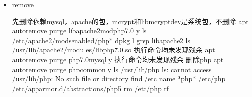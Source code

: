 \documentclass[a4paper,10pt,english]{sphinxmanual}
\begin{document}
\begin{itemize}
\begin{sphinxVerbatim}[commandchars=\\\{\}]
   
   

   
 
   
       
                                                                         \PYG{p}{[}\PYG{p}{]}
                                                           
\end{sphinxVerbatim}

\item {} 
remove

\begin{sphinxVerbatim}[commandchars=\\\{\}]
先删除依赖mysql，apache的包，mcrypt和libmcrypt\PYGZhy{}dev是系统包，不删除
apt autoremove \PYGZhy{}\PYGZhy{}purge libapache2\PYGZhy{}mod\PYGZhy{}php7.0 \PYGZhy{}y
ls /etc/apache2/mods\PYGZhy{}enabled/php*
dpkg \PYGZhy{}l \textbar{} grep libapache2
ls /usr/lib/apache2/modules/libphp7.0.so
执行命令均未发现残余
apt autoremove \PYGZhy{}\PYGZhy{}purge php7.0\PYGZhy{}mysql \PYGZhy{}y
执行命令均未发现残余
删除php
apt autoremove \PYGZhy{}\PYGZhy{}purge php\PYGZhy{}common \PYGZhy{}y
ls /usr/lib/php
    ls: cannot access \PYGZsq{}/usr/lib/php\PYGZsq{}: No such file or directory
find /etc \PYGZhy{}name \PYGZdq{}*php*\PYGZdq{}
    /etc/php
    /etc/apparmor.d/abstractions/php5
rm /etc/php \PYGZhy{}rf
\end{sphinxVerbatim}

\end{itemize}
\end{document}
